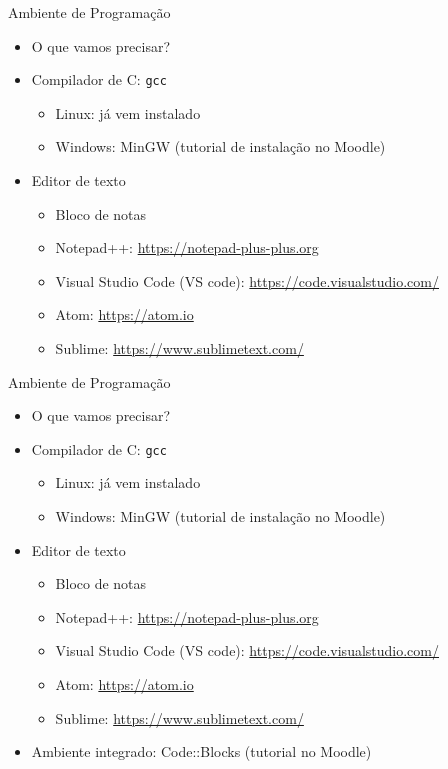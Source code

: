 \documentclass[t, aspectratio=169]{beamer}
\begin{document}
\begin{frame}[label={sec:org86a98f9},fragile]{Ambiente de Programação}
 \begin{itemize}
\item O que vamos precisar?

\item Compilador de C: \texttt{gcc}
\begin{itemize}
\item Linux: já vem instalado
\item Windows: MinGW (tutorial de instalação no Moodle)
\end{itemize}

\item Editor de texto
\begin{itemize}
\item Bloco de notas
\item Notepad++: \url{https://notepad-plus-plus.org}
\item Visual Studio Code (VS code): \url{https://code.visualstudio.com/}
\item Atom: \url{https://atom.io}
\item Sublime: \url{https://www.sublimetext.com/}
\end{itemize}
\end{itemize}
\end{frame}

\begin{frame}[label={sec:orgc4b89ee},fragile]{Ambiente de Programação}
 \begin{itemize}
\item O que vamos precisar?

\item Compilador de C: \texttt{gcc}
\begin{itemize}
\item Linux: já vem instalado
\item Windows: MinGW (tutorial de instalação no Moodle)
\end{itemize}

\item Editor de texto
\begin{itemize}
\item Bloco de notas
\item Notepad++: \url{https://notepad-plus-plus.org}
\item Visual Studio Code (VS code): \url{https://code.visualstudio.com/}
\item Atom: \url{https://atom.io}
\item Sublime: \url{https://www.sublimetext.com/}
\end{itemize}

\item Ambiente integrado: Code::Blocks (tutorial no Moodle)
\end{itemize}
\end{frame}
\end{document}
